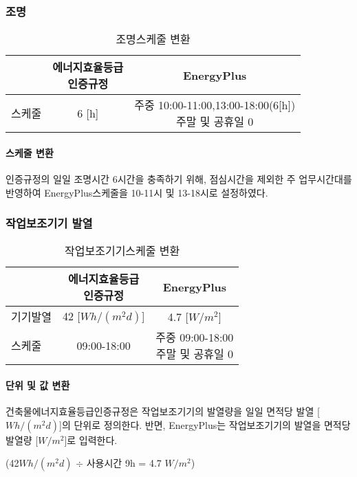 \subsubsection{조명}
\begin{table}[ht]
  \caption{조명스케줄 변환}
  \centering
  \begin{tabular}{lcc}
    \toprule
     & \makecell{에너지효율등급\\인증규정} & EnergyPlus \\ \midrule
    스케줄  &  6 [h]      & \makecell{주중 10:00-11:00,13:00-18:00(6[h])\\ 주말 및 공휴일 0} \\ \midrule
  \end{tabular}
\end{table}

\paragraph{스케줄 변환} 인증규정의 일일 조명시간 6시간을 충족하기 위해, 점심시간을 제외한 주 업무시간대를 반영하여 EnergyPlus스케줄을 10-11시 및 13-18시로 설정하였다.



\subsubsection{작업보조기기 발열}
\begin{table}[ht]
  \caption{작업보조기기스케줄 변환}
  \centering
  \begin{tabular}{lcc}
    \toprule
     & \makecell{에너지효율등급\\인증규정} & EnergyPlus \\ \midrule
    기기발열 &  42 [$Wh/(m^2d)$] & 4.7 [$W/m^2$]  \\ \midrule
    스케줄  &  09:00-18:00      & \makecell{주중 09:00-18:00\\ 주말 및 공휴일 0} \\ \midrule
  \end{tabular}
\end{table}

\paragraph{단위 및 값 변환} 건축물에너지효율등급인증규정은 작업보조기기의 발열량을 일일 면적당 발열 [$Wh/(m^2d)$]의 단위로 정의한다. 반면, EnergyPlus는 작업보조기기의 발열을 면적당 발열량 [$W/m^2$]로 입력한다.\par
  (42$Wh/(m^2d)$ $\div$ 사용시간 9h = 4.7 $W/m^2$)
